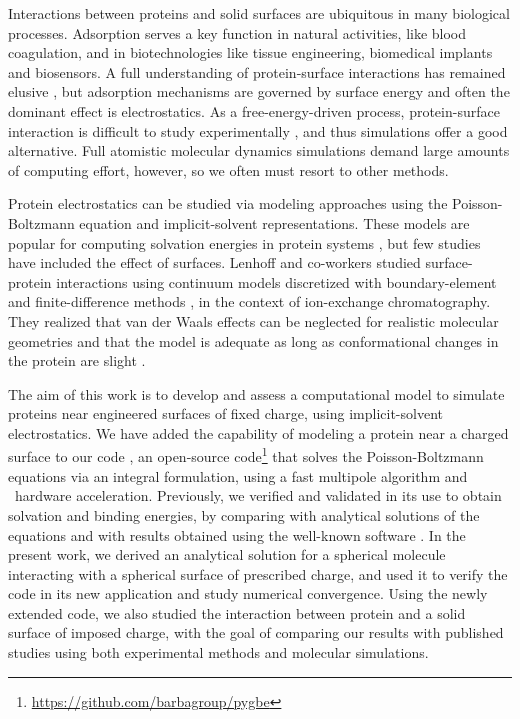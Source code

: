 
Interactions between proteins and solid surfaces are ubiquitous in many biological processes. Adsorption serves a key function in natural activities, like blood coagulation, and  in biotechnologies like tissue engineering, biomedical implants and biosensors.
A full understanding of protein-surface interactions has remained elusive \cite{Gray2004,RabeVerdesSeegel2011}, but adsorption mechanisms are governed by surface energy and often the dominant effect is electrostatics. As a free-energy-driven process, protein-surface interaction is difficult to study experimentally \cite{MijajlovicETal2013}, and thus simulations offer a good alternative. Full atomistic molecular dynamics simulations demand large amounts of computing effort, however, so we often must resort to other methods.

Protein electrostatics can be studied via modeling approaches using the Poisson-Boltzmann equation and implicit-solvent representations. These models  are popular for computing solvation energies in protein systems \cite{RouxSimonson1999,Bardhan2012}, but few studies have included the effect of surfaces. Lenhoff and co-workers studied surface-protein interactions using continuum models discretized with boundary-element \cite{YoonLenhoff1992,RothLenhoff1993,AsthagiriLenhoff1997} and finite-difference methods \cite{YaoLenhoff2004,YaoLenhoff2005}, in the context of ion-exchange chromatography. They realized that van der Waals effects can be neglected for realistic molecular geometries \cite{RothNealLenhoff1996} and that the model is adequate as long as conformational changes in the protein are slight \cite{YaoLenhoff2004,YaoLenhoff2005}. 

The aim of this work is to develop and assess a computational model to simulate proteins near engineered surfaces of fixed charge, using implicit-solvent electrostatics.
We have added the capability of modeling a protein near a charged surface to our code \pygbe, an open-source code\footnote{\url{https://github.com/barbagroup/pygbe}}  that solves the Poisson-Boltzmann equations via an integral formulation, using a fast multipole algorithm and \gpu\ hardware acceleration.  Previously, we verified and validated \pygbe in its use to obtain solvation and binding energies, by comparing with analytical solutions of the equations and with results obtained using the well-known \apbs software \cite{CooperBarba-share154331,CooperBardhanBarba2013}. 
In the present work, we derived an analytical solution for a spherical molecule interacting with a spherical surface of prescribed charge, and used it to verify the code in its new application and study numerical convergence.
Using the newly extended code, we also studied the interaction between protein \gb and a solid surface of imposed charge, with the goal of comparing our results with published studies using both experimental methods\cite{BaioWeidnerBaughGambleStaytonCastner2012} and molecular simulations.\cite{LiuLiaoZhou2013}

